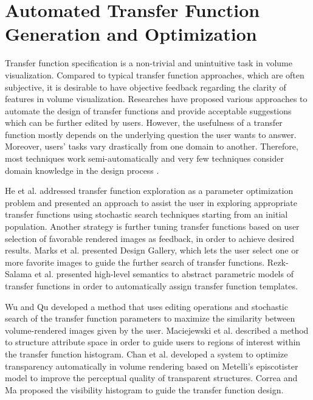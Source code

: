 \documentclass{egpubl}
\begin{document}
\section{Automated Transfer Function Generation and Optimization}
Transfer function specification is a non-trivial and unintuitive task in volume visualization. Compared to typical transfer function approaches, which are often subjective, it is desirable to have objective feedback regarding the clarity of features in volume visualization.
Researches have proposed various approaches to automate the design of transfer functions and provide acceptable suggestions which can be further edited by users. However, the usefulness of a transfer function mostly depends on the underlying question the user wants to answer. Moreover, users' tasks vary drastically from one domain to another. Therefore, most techniques work semi-automatically and very few techniques consider domain knowledge in the design process \cite{zudilova-seinstra_trends_2008}.

He et al. \cite{he_generation_1996} addressed transfer function exploration as a parameter optimization problem and presented an approach to assist the user in exploring appropriate transfer functions using stochastic search techniques starting from an initial population.
Another strategy is further tuning transfer functions based on user selection of favorable rendered images as feedback, in order to achieve desired results.
Marks et al. \cite{marks_design_1997} presented Design Gallery, which lets the user select one or more favorite images to guide the further search of transfer functions.
Rezk-Salama et al. \cite{rezk-salama_automatic_2000} presented high-level semantics to abstract parametric models of transfer functions in order to automatically assign transfer function templates.

Wu and Qu \cite{wu_interactive_2007} developed a method that uses editing operations and stochastic search of the transfer function parameters to maximize the similarity between volume-rendered images given by the user.
Maciejewski et al. \cite{maciejewski_structuring_2009} described a method to structure attribute space in order to guide users to regions of interest within the transfer function histogram.
Chan et al. \cite{chan_perception-based_2009} developed a system to optimize transparency automatically in volume rendering based on Metelli's episcotister model to improve the perceptual quality of transparent structures.
Correa and Ma \cite{correa_visibility-driven_2009} proposed the visibility histogram to guide the transfer function design.
\end{document}
